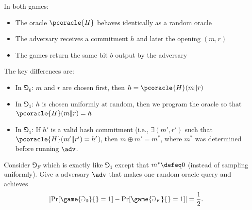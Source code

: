 \ifsolutions
\begin{mysolution}
  In both games:
  \begin{itemize}
    \item The oracle $\pcoracle{H}$ behaves identically as a random oracle
    \item The adversary receives a commitment $h$ and later the opening $(m, r)$
    \item The games return the same bit $b$ output by the adversary
  \end{itemize}
  
  The key differences are:
  \begin{itemize}
    \item In $\Game_0$: $m$ and $r$ are chosen first, then $h = \pcoracle{H}(m \| r)$
    \item In $\Game_1$: $h$ is chosen uniformly at random, then we program the oracle so that $\pcoracle{H}(m \| r) = h$
    \item In $\Game_1$: If $h'$ is a valid hash commitment (i.e., $\exists (m', r')$ such that $\pcoracle{H}(m' \| r') = h'$), then $m \oplus m' = m^*$, where $m^*$ was determined before running $\adv$.
  \end{itemize}
\end{mysolution}
\fi

\begin{exercise}
  Consider $\Game_F$ which is exactly like $\Game_1$ except that $m^* \defeq 0$ (instead of sampling uniformly). Give a \ppt adversary $\adv$ that makes one random oracle query and achieves
  \[
    \left|\Pr[\game{\Game_0}{} = 1] - \Pr[\game{\Game_F}{} = 1]\right| = \frac{1}{2}.
  \]
\end{exercise}

